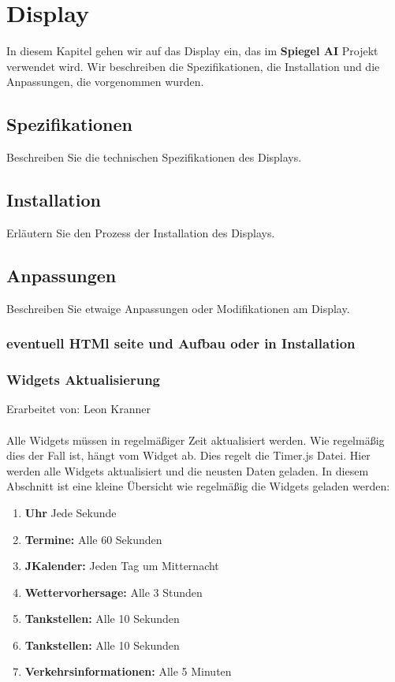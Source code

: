 \chapter{Display}

In diesem Kapitel gehen wir auf das Display ein, das im \textbf{Spiegel AI} Projekt verwendet wird. Wir beschreiben die Spezifikationen, die Installation und die Anpassungen, die vorgenommen wurden.

\section{Spezifikationen}
Beschreiben Sie die technischen Spezifikationen des Displays.

\section{Installation}
Erläutern Sie den Prozess der Installation des Displays.

\section{Anpassungen}
Beschreiben Sie etwaige Anpassungen oder Modifikationen am Display.

\subsection{eventuell HTMl seite und Aufbau oder in Installation}

\subsection{Widgets Aktualisierung}
Erarbeitet von: Leon Kranner \\ \\

Alle Widgets müssen in regelmäßiger Zeit aktualisiert werden. Wie regelmäßig dies der Fall ist, hängt vom Widget ab. Dies regelt die Timer.js Datei. Hier werden alle Widgets aktualisiert und die neusten Daten geladen. In diesem Abschnitt ist eine kleine Übersicht wie regelmäßig die Widgets geladen werden: \\

\begin{enumerate}
    \item \textbf{Uhr}
    Jede Sekunde
    
    \item \textbf{Termine:}
    Alle 60 Sekunden
    
    \item \textbf{JKalender:}
    Jeden Tag um Mitternacht
    
    \item \textbf{Wettervorhersage:}
    Alle 3 Stunden
    
    \item \textbf{Tankstellen:}
    Alle 10 Sekunden

 \item \textbf{Tankstellen:}
    Alle 10 Sekunden

 \item \textbf{Verkehrsinformationen:}
    Alle 5 Minuten
\end{enumerate}

